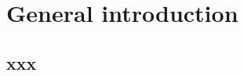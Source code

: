 \chapter[General introduction]{General introduction}

\cleardoublepage
\section{xxx}

\clearpage

\renewcommand{\bibname}{Reference}


\clearpage
\thispagestyle{empty}
~
\cleardoublepage